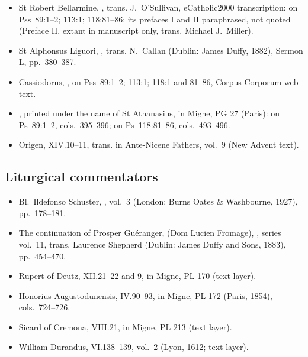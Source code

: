 {\begin{itemize}
\item St Robert Bellarmine, , trans. J.~O'Sullivan, eCatholic2000 transcription: on Pss~89:1--2; 113:1; 118:81--86; its prefaces I and II paraphrased, not quoted (Preface II, extant in manuscript only, trans. Michael J.~Miller).
\item St Alphonsus Liguori, , trans. N.~Callan (Dublin: James Duffy, 1882), Sermon L, pp.~380--387.
\item Cassiodorus, , on Pss~89:1--2; 113:1; 118:1 and 81--86, Corpus Corporum web text.
\item {}, printed under the name of St Athanasius, in Migne, PG 27 (Paris): on Ps~89:1--2, cols.~395--396; on Ps~118:81--86, cols.~493--496.
\item Origen,  XIV.10--11, trans. in Ante-Nicene Fathers, vol.~9 (New Advent text).
\end{itemize}

\subsection*{Liturgical commentators}
\begin{itemize}
\item Bl.\ Ildefonso Schuster, , vol.~3 (London: Burns Oates \& Washbourne, 1927), pp.~178--181.
\item The continuation of Prosper Gu\'eranger,  (Dom Lucien Fromage), , series vol.~11, trans. Laurence Shepherd (Dublin: James Duffy and Sons, 1883), pp.~454--470.
\item Rupert of Deutz,  XII.21--22 and  9, in Migne, PL 170 (text layer).
\item Honorius Augustodunensis,  IV.90--93, in Migne, PL 172 (Paris, 1854), cols.~724--726.
\item Sicard of Cremona,  VIII.21, in Migne, PL 213 (text layer).
\item William Durandus,  VI.138--139, vol.~2 (Lyon, 1612; text layer).
\end{itemize}

}
